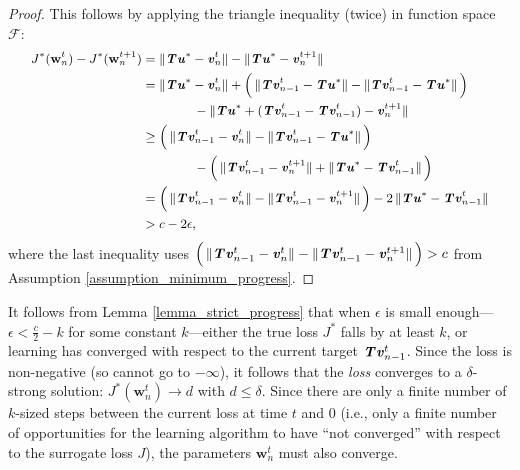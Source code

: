 \documentclass{article}
\renewcommand{\vec}[1]{\textbf{\textit{#1}}}
\newcommand{\val}{\vec{v}}
\newcommand{\valt}{\val}
\newcommand{\target}{\vec{u}}
\newcommand{\params}{\textbf{w}}
\newcommand{\bellmanop}{\textbf{\textit{T}}}
\newcommand{\smashednorm}[1]{\left\lVert \smash{#1} \right\rVert}
\begin{document}
\begin{proof}
	This follows by applying the triangle inequality (twice) in function space $\mathcal{F}$:
	\begin{equation}
		\small
	\begin{split}
		J^*(\params_n^t) - J^*(\params_n^{t+1})
		&= \smashednorm{\bellmanop\target^* - \valt_n^t} - \smashednorm{\bellmanop\target^* - \valt_n^{t+1}}\\
		&= \smashednorm{\bellmanop\target^* - \valt_n^t} + \Big(\smashednorm{\bellmanop\valt_{n-1}^t - \bellmanop\target^*} - \smashednorm{\bellmanop\valt_{n-1}^t - \bellmanop\target^*}\Big) \\
		&\quad\quad\quad\quad - \smashednorm{\bellmanop\target^* + (\bellmanop\valt_{n-1}^t - \bellmanop\valt_{n-1}^t) - \valt_n^{t+1}}\\
		&\geq \Big(\smashednorm{\bellmanop\valt_{n-1}^t - \valt_n^t} - \smashednorm{\bellmanop\valt_{n-1}^t - \bellmanop\target^*}\Big)\\
		&\quad\quad\quad\quad - \Big(\smashednorm{\bellmanop\valt_{n-1}^t - \valt_n^{t+1}}+\smashednorm{\bellmanop\target^*- \bellmanop\valt_{n-1}^t }\Big)\\
		&= \Big(\smashednorm{\bellmanop\valt_{n-1}^t - \valt_n^t} -\smashednorm{\bellmanop\valt_{n-1}^t - \valt_n^{t+1}} \Big) - 2\smashednorm{\bellmanop\target^*- \bellmanop\valt_{n-1}^t }\\
		&> c - 2\epsilon,\\
	\end{split}
	\end{equation}
	where the last inequality uses $\Big(\smashednorm{\bellmanop\valt_{n-1}^t - \valt_n^t} -\smashednorm{\bellmanop\valt_{n-1}^t - \valt_n^{t+1}} \Big) > c$ from Assumption \ref{assumption_minimum_progress}.
\end{proof}

It follows from Lemma \ref{lemma_strict_progress} that when $\epsilon$ is small enough---$\epsilon < \frac{c}{2} - k$ for some constant $k$---either the true loss $J^*$ falls by at least $k$, or learning has converged with respect to the current target $\bellmanop\valt_{n-1}^t$. Since the loss is non-negative (so cannot go to $-\infty$), it follows that the \textit{loss} converges to a $\delta$-strong solution: $J^*(\params_n^t) \to d$ with $d \leq \delta$. Since there are only a finite number of $k$-sized steps between the current loss at time $t$ and $0$ (i.e., only a finite number of opportunities for the learning algorithm to have ``not converged'' with respect to the surrogate loss $J$), the parameters $\params_n^t$ must also converge.
\end{document}
